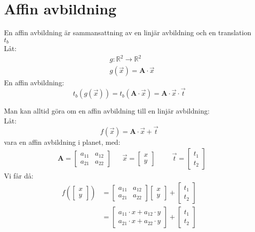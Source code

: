 
\section{Affin avbildning} %
\label{sec:affin_avbildning}
En affin avbildning är sammansattning av en linjär avbildning och en translation $t_b$\\
Låt:
\begin{align*}
&g:\mathbb{R}^2 \rightarrow \mathbb{R}^2\\
&g(\vec{x}) = \mathbf{A} \cdot \vec{x}
\end{align*}
En  affin avbildning:
\[
    t_b(g(\vec{x})) = t_b(\mathbf{A} \cdot \vec{x}) = \mathbf{A} \cdot \vec{x} \cdot \vec{t}
\]
\begin{Ex}
    Man kan alltid göra om en affin avbildning till en linjär avbildning:\\
    Låt:
    \[
         f(\vec{x}) = \mathbf{A} \cdot \vec{x} + \vec{t}
    \]
    vara en affin avbildning i planet, med:
    \begin{align*}
    &\mathbf{A} = \begin{bmatrix} a_{11}&a_{12}\\a_{21}&a_{22} \end{bmatrix}
    &&\vec{x} = \begin{bmatrix} x\\y \end{bmatrix}
    &&&\vec{t} = \begin{bmatrix} t_1\\t_2 \end{bmatrix}
    \end{align*}
    Vi får då:
    \begin{align*}
        f(\begin{bmatrix} x\\y \end{bmatrix}) &= \begin{bmatrix} a_{11}&a_{12}\\a_{21}&a_{22} \end{bmatrix} \begin{bmatrix} x\\y \end{bmatrix} + \begin{bmatrix} t_1\\t_2 \end{bmatrix} \\
        &= \begin{bmatrix} a_{11} \cdot x + a_{12} \cdot y\\a_{21} \cdot x + a_{22} \cdot y \end{bmatrix} + \begin{bmatrix} t_1\\t_2 \end{bmatrix} \\

\end{align*}
\end{Ex}
